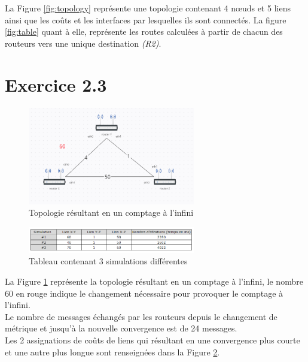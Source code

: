 \documentclass[11pt]{article}
\begin{document}
La Figure \ref{fig:topology} représente une topologie contenant 4 nœuds et 5 liens ainsi que les coûts et les interfaces par lesquelles ils sont connectés. La figure \ref{fig:table} quant à elle, représente les routes calculées à partir de chacun des routeurs vers une unique destination \textit{(R2)}.



\section{Exercice 2.3}
\begin{figure} [h!]
\centering
  \includegraphics[width=0.65\textwidth]{../documents/infinity-figure.png}
  \caption{Topologie résultant en un comptage à l'infini}
   \label{fig:inf-topo}
\end{figure}
\begin{figure} [h!]
\centering
  \includegraphics[width=0.65\textwidth]{../documents/infinity-table.png}
  \caption{Tableau contenant 3 simulations différentes}
   \label{fig:inf-table}
\end{figure}

La Figure \ref{fig:inf-topo} représente la topologie résultant en un comptage à l'infini, le nombre 60 en rouge indique le changement nécessaire pour provoquer le comptage à l'infini.\\

Le nombre de messages échangés par les routeurs depuis le changement de métrique et jusqu'à la nouvelle convergence est de 24 messages.\\

Les 2 assignations de coûts de liens qui résultant en une convergence plus courte et une autre plus longue sont renseignées dans la Figure \ref{fig:inf-table}.
\end{document}
